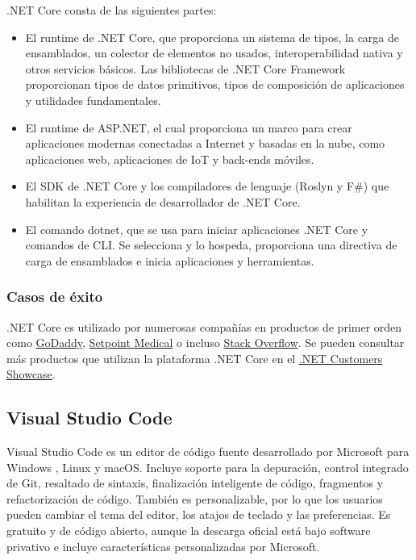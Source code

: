 .NET Core consta de las siguientes partes:
\begin{itemize}
    \item El runtime de .NET Core, que proporciona un sistema de tipos, la carga de ensamblados, un colector de elementos no usados, interoperabilidad nativa y otros servicios básicos. Las bibliotecas de .NET Core Framework proporcionan tipos de datos primitivos, tipos de composición de aplicaciones y utilidades fundamentales.
    \item El runtime de ASP.NET, el cual proporciona un marco para crear aplicaciones modernas conectadas a Internet y basadas en la nube, como aplicaciones web, aplicaciones de IoT y back-ends móviles.
    \item El SDK de .NET Core y los compiladores de lenguaje (Roslyn y F\#) que habilitan la experiencia de desarrollador de .NET Core.
    \item El comando dotnet, que se usa para iniciar aplicaciones .NET Core y comandos de CLI. Se selecciona y lo hospeda, proporciona una directiva de carga de ensamblados e inicia aplicaciones y herramientas.
\end{itemize}

\subsubsection{Casos de éxito}
.NET Core es utilizado por numerosas compañías en productos de primer orden como \href{https://dotnet.microsoft.com/platform/customers}{GoDaddy}, \href{https://customers.microsoft.com/en-us/story/744483-setpoint-medical-discrete-manufacturing-net}{Setpoint Medical} o incluso \href{https://www.youtube.com/watch?v=1DIDWWKk8Bg&feature=youtu.be}{Stack Overflow}. Se pueden consultar más productos que utilizan la plataforma .NET Core en el \href{https://dotnet.microsoft.com/platform/customers}{.NET Customers Showcase}.

\subsection{Visual Studio Code}
Visual Studio Code es un editor de código fuente desarrollado por Microsoft para Windows , Linux y macOS. Incluye soporte para la depuración, control integrado de Git, resaltado de sintaxis, finalización inteligente de código, fragmentos y refactorización de código. También es personalizable, por lo que los usuarios pueden cambiar el tema del editor, los atajos de teclado y las preferencias. Es gratuito y de código abierto, aunque la descarga oficial está bajo software privativo e incluye características personalizadas por Microsoft.

